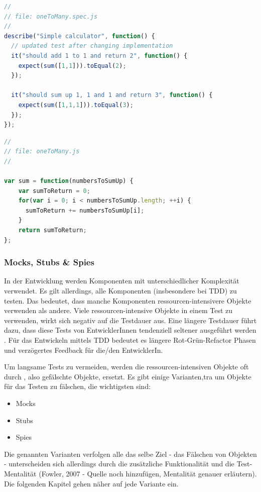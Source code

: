 \begin{lstlisting}[language=JavaScript]
//
// file: oneToMany.spec.js
//
describe("Simple calculator", function() {
  // updated test after changing implementation
  it("should add 1 to 1 and return 2", function() {
    expect(sum([1,1])).toEqual(2);
  });

  it("should sum up 1, 1 and 1 and return 3", function() {
    expect(sum([1,1,1])).toEqual(3);
  });
});
\end{lstlisting}

\begin{lstlisting}[language=JavaScript]
//
// file: oneToMany.js
//

var sum = function(numbersToSumUp) {
    var sumToReturn = 0;
    for(var i = 0; i < numbersToSumUp.length; ++i) {
      sumToReturn += numbersToSumUp[i];
    }
    return sumToReturn;
};
\end{lstlisting}

\subsubsection{Mocks, Stubs \& Spies}
In der Entwicklung werden Komponenten mit unterschiedlicher Komplexität verwendet. Es gilt allerdings, alle Komponenten (insbesondere bei TDD) zu testen. Das bedeutet, dass manche Komponenten ressourcen-intensivere Objekte verwenden als andere. Viele ressourcen-intensive Objekte in einem Test zu verwenden, wirkt sich negativ auf die Testdauer aus. Eine längere Testdauer führt dazu, dass diese Tests von EntwicklerInnen tendenziell seltener ausgeführt werden \autocite[4]{Johansen:2011}. Für das Entwickeln mittels TDD bedeutet es längere Rot-Grün-Refactor Phasen und verzögertes Feedback für die/den EntwicklerIn.

Um langsame Tests zu vermeiden, werden die ressourcen-intensiven Objekte oft durch , also gefälschte Objekte, ersetzt. Es gibt einige Varianten,tra um Objekte für das Testen zu fälschen, die wichtigsten sind:

\begin{itemize}
  \item Mocks
  \item Stubs
  \item Spies
\end{itemize}

Die genannten Varianten verfolgen alle das selbe Ziel - das Fälschen von Objekten - unterscheiden sich allerdings durch die zusätzliche Funktionalität und die Test-Mentalität (Fowler, 2007 - Quelle noch hinzufügen, Mentalität genauer erläutern). Die folgenden Kapitel gehen näher auf jede Variante ein.

